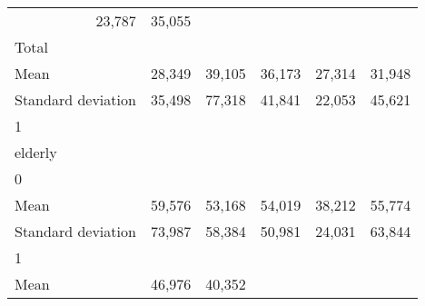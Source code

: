 \begin{tabular}{llllll}
  \multicolumn{1}{r}{23,787} &
  \multicolumn{1}{r}{35,055} \\
\multicolumn{1}{l}{\hspace{3em}Total} &
  \multicolumn{1}{|r}{} &
  \multicolumn{1}{r}{} &
  \multicolumn{1}{r}{} &
  \multicolumn{1}{r}{} &
  \multicolumn{1}{r}{} \\
\multicolumn{1}{l}{\hspace{4em}Mean} &
  \multicolumn{1}{|r}{28,349} &
  \multicolumn{1}{r}{39,105} &
  \multicolumn{1}{r}{36,173} &
  \multicolumn{1}{r}{27,314} &
  \multicolumn{1}{r}{31,948} \\
\multicolumn{1}{l}{\hspace{4em}Standard deviation} &
  \multicolumn{1}{|r}{35,498} &
  \multicolumn{1}{r}{77,318} &
  \multicolumn{1}{r}{41,841} &
  \multicolumn{1}{r}{22,053} &
  \multicolumn{1}{r}{45,621} \\
\multicolumn{1}{l}{\hspace{1em}1} &
  \multicolumn{1}{|r}{} &
  \multicolumn{1}{r}{} &
  \multicolumn{1}{r}{} &
  \multicolumn{1}{r}{} &
  \multicolumn{1}{r}{} \\
\multicolumn{1}{l}{\hspace{2em}elderly} &
  \multicolumn{1}{|r}{} &
  \multicolumn{1}{r}{} &
  \multicolumn{1}{r}{} &
  \multicolumn{1}{r}{} &
  \multicolumn{1}{r}{} \\
\multicolumn{1}{l}{\hspace{3em}0} &
  \multicolumn{1}{|r}{} &
  \multicolumn{1}{r}{} &
  \multicolumn{1}{r}{} &
  \multicolumn{1}{r}{} &
  \multicolumn{1}{r}{} \\
\multicolumn{1}{l}{\hspace{4em}Mean} &
  \multicolumn{1}{|r}{59,576} &
  \multicolumn{1}{r}{53,168} &
  \multicolumn{1}{r}{54,019} &
  \multicolumn{1}{r}{38,212} &
  \multicolumn{1}{r}{55,774} \\
\multicolumn{1}{l}{\hspace{4em}Standard deviation} &
  \multicolumn{1}{|r}{73,987} &
  \multicolumn{1}{r}{58,384} &
  \multicolumn{1}{r}{50,981} &
  \multicolumn{1}{r}{24,031} &
  \multicolumn{1}{r}{63,844} \\
\multicolumn{1}{l}{\hspace{3em}1} &
  \multicolumn{1}{|r}{} &
  \multicolumn{1}{r}{} &
  \multicolumn{1}{r}{} &
  \multicolumn{1}{r}{} &
  \multicolumn{1}{r}{} \\
\multicolumn{1}{l}{\hspace{4em}Mean} &
  \multicolumn{1}{|r}{46,976} &
  \multicolumn{1}{r}{40,352} &

\end{tabular}
